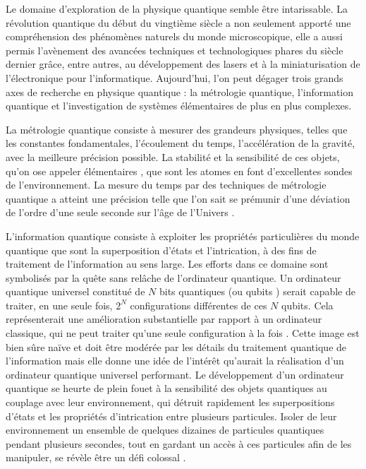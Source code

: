 \bigskip
Le domaine d'exploration de la physique quantique semble être intarissable.
La \og révolution quantique \fg{} du début du vingtième siècle a non seulement apporté une compréhension des phénomènes naturels du monde microscopique, elle a aussi permis l'avènement des avancées techniques et technologiques phares du siècle dernier grâce, entre autres, au développement des lasers et à la miniaturisation de l'électronique pour l'informatique.
Aujourd'hui, l'on peut dégager trois grands axes de recherche en physique quantique : la métrologie quantique, l'information quantique et l'investigation de systèmes élémentaires de plus en plus complexes.

La métrologie quantique consiste à mesurer des grandeurs physiques, telles que les constantes fondamentales, l'écoulement du temps, l'accélération de la gravité, avec la meilleure précision possible.
La stabilité et la sensibilité de ces objets, qu'on ose appeler \og élémentaires \fg{}, que sont les atomes en font d'excellentes sondes de l'environnement.
La mesure du temps par des techniques de métrologie quantique a atteint une précision telle que l'on sait se prémunir d'une déviation de l'ordre d'une seule seconde sur l'âge de l'Univers \cite{Ludlow2015,Oates2013}.

L'information quantique consiste à exploiter les propriétés particulières du monde quantique que sont la superposition d'états et l'intrication, à des fins de traitement de l'information au sens large.
Les efforts dans ce domaine sont symbolisés par la quête sans relâche de l'ordinateur quantique.
Un ordinateur quantique universel constitué de $N$ bits quantiques (ou \og qubits \fg{}) serait capable de traiter, en une seule fois, $2^N$ configurations différentes de ces $N$ qubits.
Cela représenterait une amélioration substantielle par rapport à un ordinateur classique, qui ne peut traiter qu'une seule configuration à la fois \cite{deutsch1985}.
Cette image est bien sûre naïve et doit être modérée par les détails du traitement quantique de l'information mais elle donne une idée de l'intérêt qu'aurait la réalisation d'un ordinateur quantique universel performant.
Le développement d'un ordinateur quantique se heurte de plein fouet à la sensibilité des objets quantiques au couplage avec leur environnement, qui détruit rapidement les superpositions d'états et les propriétés d'intrication entre plusieurs particules.
Isoler de leur environnement un ensemble de quelques dizaines de particules quantiques pendant plusieurs secondes, tout en gardant un accès à ces particules afin de les manipuler, se révèle être un défi colossal \cite{QM_ZUREKDECOH91}.

